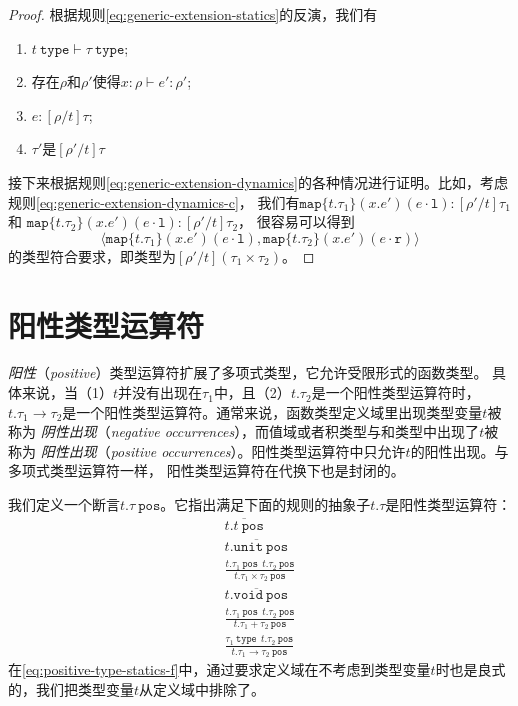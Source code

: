 \begin{proof}
	根据规则\ref{eq:generic-extension-statics}的反演，我们有
	\begin{enumerate}
		\item $t\ \texttt{type}\vdash\tau\ \texttt{type}$;
		\item 存在$\rho$和$\rho'$使得$x:\rho\vdash e':\rho'$;
		\item $e:[\rho/t]\tau$;
		\item $\tau'$是$[\rho'/t]\tau$
	\end{enumerate}
接下来根据规则\ref{eq:generic-extension-dynamics}的各种情况进行证明。比如，考虑规则\ref{eq:generic-extension-dynamics-c}，
我们有$\texttt{map}\{t.\tau_1\}(x.e')(e\cdot\texttt{l}):[\rho'/t]\tau_1$和
$\texttt{map}\{t.\tau_2\}(x.e')(e\cdot\texttt{l}):[\rho'/t]\tau_2$，
很容易可以得到
$$\langle\texttt{map}\{t.\tau_1\}(x.e')(e\cdot \texttt{l}),\texttt{map}\{t.\tau_2\}(x.e')(e\cdot \texttt{r})\rangle$$
的类型符合要求，即类型为$[\rho'/t](\tau_1\times\tau_2)$。
\end{proof}

\section{阳性类型运算符}

\textit{阳性}（\textit{positive}）类型运算符扩展了多项式类型，它允许受限形式的函数类型。
具体来说，当（1）$t$并没有出现在$\tau_1$中，且（2）$t.\tau_2$是一个阳性类型运算符时，
$t.\tau_1\rightarrow\tau_2$是一个阳性类型运算符。通常来说，函数类型定义域里出现类型变量$t$被称为
\textit{阴性出现}（\textit{negative occurrences}），而值域或者积类型与和类型中出现了$t$被称为
\textit{阳性出现}（\textit{positive occurrences}）。阳性类型运算符中只允许$t$的阳性出现。与多项式类型运算符一样，
阳性类型运算符在代换下也是封闭的。

我们定义一个断言$t.\tau\ \texttt{pos}$。它指出满足下面的规则的抽象子$t.\tau$是阳性类型运算符：
\begin{subequations}\label{eq:positive-type-statics}
	\begin{gather}
	\overline{t.t\ \texttt{pos}} \label{eq:positive-type-statics-a} \\
	\overline{t.\texttt{unit}\ \texttt{pos}} \label{eq:positive-type-statics-b}\\
	\frac{t.\tau_1\ \texttt{pos}\ \ t.\tau_2\ \texttt{pos}}{t.\tau_1\times\tau_2\ \texttt{pos}} \label{eq:positive-type-statics-c}\\
	\overline{t.\texttt{void}\ \texttt{pos}} \label{eq:positive-type-statics-d}\\
	\frac{t.\tau_1\ \texttt{pos}\ \ t.\tau_2\ \texttt{pos}}{t.\tau_1+\tau_2\ \texttt{pos}} \label{eq:positive-type-statics-e}\\
	\frac{\tau_1\ \texttt{type}\ \ t.\tau_2\ \texttt{pos}}{t.\tau_1\rightarrow\tau_2\ \texttt{pos}}\label{eq:positive-type-statics-f}
	\end{gather}
\end{subequations}
在\ref{eq:positive-type-statics-f}中，通过要求定义域在不考虑到类型变量$t$时也是良式的，我们把类型变量$t$从定义域中排除了。

